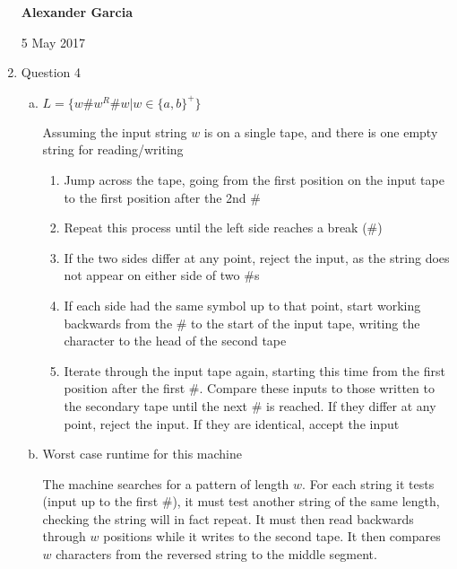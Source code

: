 \documentclass[11pt]{article}
\begin{document}
\begin{enumerate}
			\newpage

			\textbf{Alexander Garcia}

			5 May 2017 \\

		\item Question 4

		\begin{enumerate}[(a)]

			\item $L = \{w\#w^R\#w |w \in \{a,b\}^+\}$

				Assuming the input string $w$ is on a single tape, and there is one empty string for reading/writing

				\begin{enumerate}[(1)]

					\item 	Jump across the tape, going from the first position on the input tape to the first
						position after the 2nd $\#$

					\item 	Repeat this process until the left side reaches a break ($\#$)

					\item 	If the two sides differ at any point, reject the input, as the string does not appear on
						either side of two $\#$s

					\item 	If each side had the same symbol up to that point, start working backwards from the
						$\#$ to the start of the input tape, writing the character to the head of the second tape

					\item 	Iterate through the input tape again, starting this time from the first position after the
						first $\#$. Compare these inputs to those written to the secondary tape until the next
						$\#$ is reached. If they differ at any point, reject the input. If they are identical,
						accept the input \\

				\end{enumerate}

			\item Worst case runtime for this machine

				The machine searches for a pattern of length $w$. For each string it tests (input up to the first $\#$), it
				must test another string of the same length, checking the string will in fact repeat. It must then read
				backwards through $w$ positions while it writes to the second tape. It then compares $w$ characters from the
				reversed string to the middle segment.


\end{enumerate}
\end{enumerate}
\end{document}
